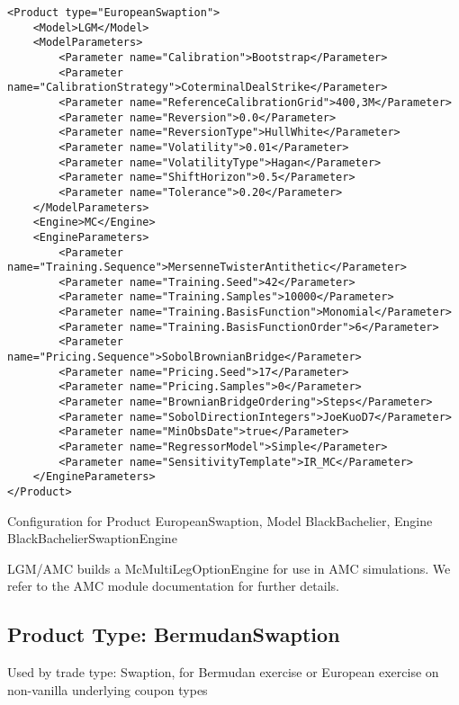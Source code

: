 \begin{longlisting}
\begin{verbatim}
<Product type="EuropeanSwaption">
    <Model>LGM</Model>
    <ModelParameters>
        <Parameter name="Calibration">Bootstrap</Parameter>
        <Parameter name="CalibrationStrategy">CoterminalDealStrike</Parameter>
        <Parameter name="ReferenceCalibrationGrid">400,3M</Parameter>
        <Parameter name="Reversion">0.0</Parameter>
        <Parameter name="ReversionType">HullWhite</Parameter>
        <Parameter name="Volatility">0.01</Parameter>
        <Parameter name="VolatilityType">Hagan</Parameter>
        <Parameter name="ShiftHorizon">0.5</Parameter>
        <Parameter name="Tolerance">0.20</Parameter>
    </ModelParameters>
    <Engine>MC</Engine>
    <EngineParameters>
        <Parameter name="Training.Sequence">MersenneTwisterAntithetic</Parameter>
        <Parameter name="Training.Seed">42</Parameter>
        <Parameter name="Training.Samples">10000</Parameter>
        <Parameter name="Training.BasisFunction">Monomial</Parameter>
        <Parameter name="Training.BasisFunctionOrder">6</Parameter>
        <Parameter name="Pricing.Sequence">SobolBrownianBridge</Parameter>
        <Parameter name="Pricing.Seed">17</Parameter>
        <Parameter name="Pricing.Samples">0</Parameter>
        <Parameter name="BrownianBridgeOrdering">Steps</Parameter>
        <Parameter name="SobolDirectionIntegers">JoeKuoD7</Parameter>
        <Parameter name="MinObsDate">true</Parameter>
        <Parameter name="RegressorModel">Simple</Parameter>
        <Parameter name="SensitivityTemplate">IR_MC</Parameter>
    </EngineParameters>
</Product>
\end{verbatim}
\caption{Configuration for Product EuropeanSwaption, Model BlackBachelier, Engine BlackBachelierSwaptionEngine}
\label{lst:peconfig_EuropeanSwaption_LGM_MC}
\end{longlisting}

LGM/AMC builds a McMultiLegOptionEngine for use in AMC simulations. We refer to the AMC module documentation for further
details.

\subsection{Product Type: BermudanSwaption}

Used by trade type: Swaption, for Bermudan exercise or European exercise on non-vanilla underlying coupon types

